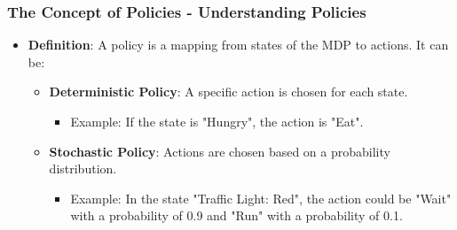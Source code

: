 \documentclass[aspectratio=169]{beamer}
\begin{document}
\begin{frame}[fragile]
    \frametitle{The Concept of Policies - Understanding Policies}
    \begin{itemize}
        \item \textbf{Definition}: A policy is a mapping from states of the MDP to actions. It can be:
        \begin{itemize}
            \item \textbf{Deterministic Policy}: A specific action is chosen for each state.
            \begin{itemize}
                \item Example: If the state is "Hungry", the action is "Eat".
            \end{itemize}
            \item \textbf{Stochastic Policy}: Actions are chosen based on a probability distribution.
            \begin{itemize}
                \item Example: In the state "Traffic Light: Red", the action could be "Wait" with a probability of 0.9 and "Run" with a probability of 0.1.
            \end{itemize}
        \end{itemize}
    \end{itemize}
\end{frame}
\end{document}
